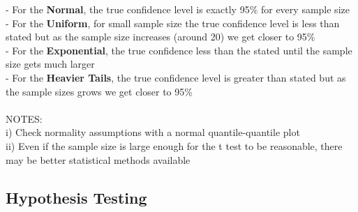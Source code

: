 \documentclass[12pt, a4paper]{article}
\begin{document}
	- For the \textbf{Normal}, the true confidence level is exactly 95\% for every sample size \\
	- For the \textbf{Uniform}, for small sample size the true confidence level is less than stated but as \hspace*{2mm} the sample size increases (around 20) we get closer to 95\% \\
	- For the \textbf{Exponential}, the true confidence less than the stated until the sample size gets much \hspace*{2mm}larger \\
	- For the \textbf{Heavier Tails}, the true confidence level is greater than stated but as the sample \hspace*{2mm} sizes grows we get closer to 95\% \\~\\
	NOTES: \\
	i) Check normality assumptions with a normal quantile-quantile plot \\
	ii) Even if the sample size is large enough for the t test to be reasonable, there may be better \hspace*{4mm} statistical methods available \newpage
	
\begin{center} \section{Hypothesis Testing} \end{center}
\end{document}
